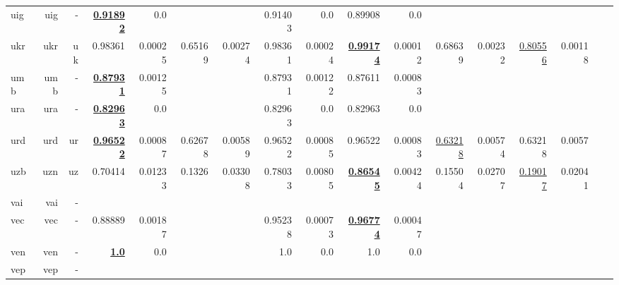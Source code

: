 \documentclass[11pt]{article}
\begin{document}
\begin{table*}[h]
{\begin{tabular}{lrrrrrrrrrrrrrrrr}
uig         & uig         & -         & \textbf{\underline{0.91892}}         & 0.0         &          &          & 0.91403         & 0.0         & 0.89908         & 0.0         &          &          &          &          \\
ukr         & ukr         & uk         & 0.98361         & 0.00025         & 0.65169         & 0.00274         & 0.98361         & 0.00024         & \textbf{\underline{0.99174}}         & 0.00012         & 0.68639         & 0.00232         & \underline{0.80556}         & 0.00118         \\
umb         & umb         & -         & \textbf{\underline{0.87931}}         & 0.00125         &          &          & 0.87931         & 0.00122         & 0.87611         & 0.00083         &          &          &          &          \\
ura         & ura         & -         & \textbf{\underline{0.82963}}         & 0.0         &          &          & 0.82963         & 0.0         & 0.82963         & 0.0         &          &          &          &          \\
urd         & urd         & ur         & \textbf{\underline{0.96522}}         & 0.00087         & 0.62678         & 0.00589         & 0.96522         & 0.00085         & 0.96522         & 0.00083         & \underline{0.63218}         & 0.00574         & 0.63218         & 0.0057         \\
uzb         & uzn         & uz         & 0.70414         & 0.01233         & 0.1326         & 0.03308         & 0.78033         & 0.00805         & \textbf{\underline{0.86545}}         & 0.00424         & 0.15504         & 0.02707         & \underline{0.19017}         & 0.02041         \\
vai         & vai         & -         &          &          &          &          &          &          &          &          &          &          &          &          \\
vec         & vec         & -         & 0.88889         & 0.00187         &          &          & 0.95238         & 0.00073         & \textbf{\underline{0.96774}}         & 0.00047         &          &          &          &          \\
ven         & ven         & -         & \textbf{\underline{1.0}}         & 0.0         &          &          & 1.0         & 0.0         & 1.0         & 0.0         &          &          &          &          \\
vep         & vep         & -         &          &          &          &          &          &          &          &          &          &          &          &          \\

\end{tabular}}
\end{table*}
\end{document}
